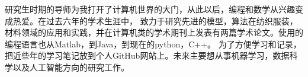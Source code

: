 \cvsection{}


\begin{cvparagraph}
研究生时期的导师为我打开了计算机世界的大门，从此以后，编程和数学从兴趣变成热爱。在过去六年的学术生涯中，
致力于研究先进的模型，算法在纺织服装，材料领域的应用和实践，并在计算机类的学术期刊上发表有两篇学术论文。使用的编程语言也从Matlab，到Java，到现在的python，C++。
为了方便学习和记录，把近些年的学习笔记放到个人GitHub网站上。未来主要想从事机器学习，数据科学以及人工智能方向的研究工作。
\end{cvparagraph}
